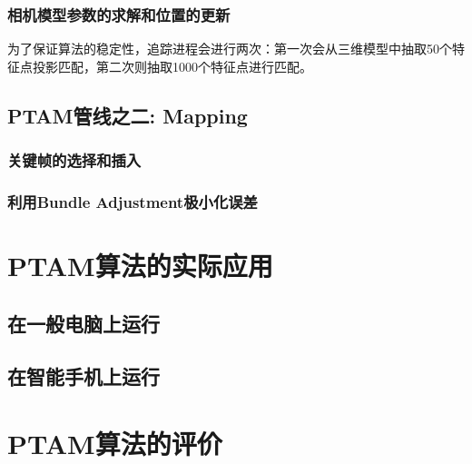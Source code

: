 \subsubsection{相机模型参数的求解和位置的更新}


为了保证算法的稳定性，追踪进程会进行两次：第一次会从三维模型中抽取50个特征点投影匹配，第二次则抽取1000个特征点进行匹配。


\subsection{PTAM管线之二: Mapping}

\subsubsection{关键帧的选择和插入}

\subsubsection{利用Bundle Adjustment极小化误差}


\section{PTAM算法的实际应用}
\subsection{在一般电脑上运行}
\subsection{在智能手机上运行}

\section{PTAM算法的评价}
